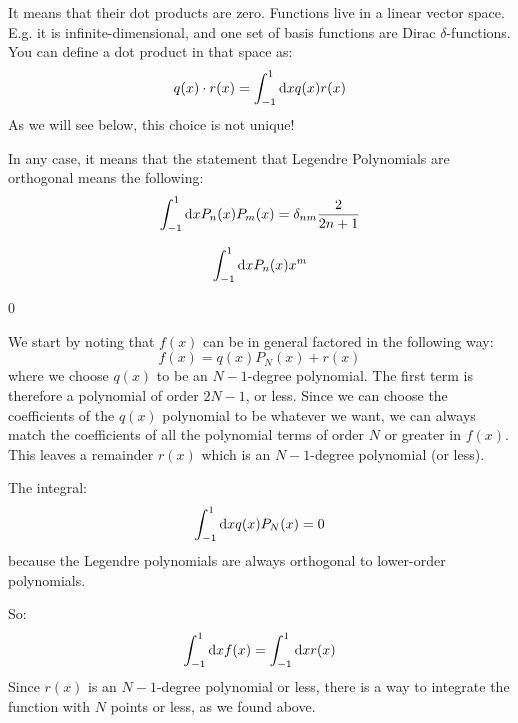 \begin{answer}
  It means that their dot products are zero. Functions live in a linear
  vector space. E.g. it is infinite-dimensional, and one set of basis
  functions are Dirac $\delta$-functions. You can define a dot product
  in that space as:
  \begin{equation}
    q(x) \cdot r(x) = \int_{-1}^{1} {\rm d}x q(x) r(x)
  \end{equation}
  As we will see below, this choice is not unique!

  In any case, it means that the statement that Legendre Polynomials
  are orthogonal means the following:
  \begin{equation}
    \int_{-1}^{1} {\rm d}x P_n(x) P_m(x) = \delta_{nm}
    \frac{2}{2n+1}
  \end{equation}
\end{answer}

  
  \begin{equation}
    \int_{-1}^{1} {\rm d}x P_{n}(x) x^m 
  \end{equation}
  
  \begin{answer}
    0
  \end{answer}

We start by noting that $f(x)$  can be in general factored in the
following way:
\begin{equation}
f(x) = q(x) P_N(x) + r(x)
\end{equation}
where we choose $q(x)$ to be an $N-1$-degree polynomial. The first
term is therefore a polynomial of order $2N-1$, or less. Since we can
choose the coefficients of the $q(x)$ polynomial to be whatever we
want, we can always match the coefficients of all the polynomial terms
of order $N$ or greater in $f(x)$. This leaves a remainder $r(x)$
which is an $N-1$-degree polynomial (or less).

The integral:
\begin{equation}
\int_{-1}^{1} {\rm d}x q(x) P_N(x) = 0
\end{equation}
because the Legendre polynomials are always orthogonal to lower-order
polynomials.

So:
\begin{equation}
\int_{-1}^{1} {\rm d}x f(x) = \int_{-1}^{1} {\rm d}x r(x)
\end{equation}
Since $r(x)$ is an $N-1$-degree polynomial or less, there is a way to
integrate the function with $N$ points or less, as we found above.

